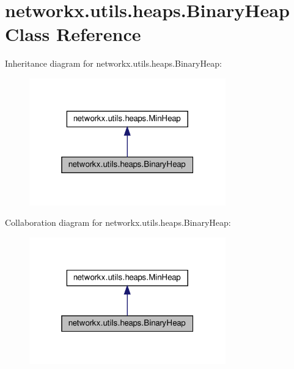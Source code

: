 \hypertarget{classnetworkx_1_1utils_1_1heaps_1_1BinaryHeap}{}\section{networkx.\+utils.\+heaps.\+Binary\+Heap Class Reference}
\label{classnetworkx_1_1utils_1_1heaps_1_1BinaryHeap}


Inheritance diagram for networkx.\+utils.\+heaps.\+Binary\+Heap\+:
\nopagebreak
\begin{figure}[H]
\begin{center}
\leavevmode
\includegraphics[width=241pt]{classnetworkx_1_1utils_1_1heaps_1_1BinaryHeap__inherit__graph}
\end{center}
\end{figure}


Collaboration diagram for networkx.\+utils.\+heaps.\+Binary\+Heap\+:
\nopagebreak
\begin{figure}[H]
\begin{center}
\leavevmode
\includegraphics[width=241pt]{classnetworkx_1_1utils_1_1heaps_1_1BinaryHeap__coll__graph}
\end{center}
\end{figure}
